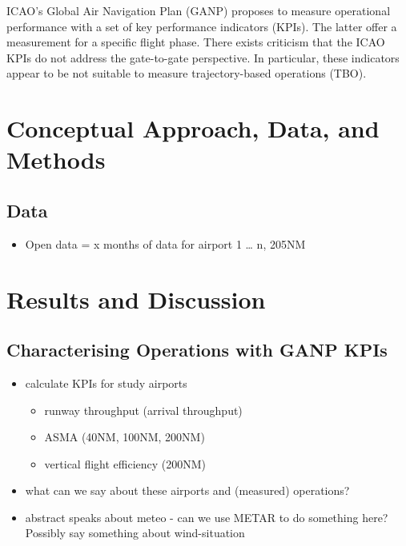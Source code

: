 \documentclass[
  journal,
]{IEEEtran}%
\providecommand{\tightlist}{%
  \setlength{\itemsep}{0pt}\setlength{\parskip}{0pt}}\usepackage{longtable,booktabs,array}
\begin{document}
ICAO's Global Air Navigation Plan (GANP) proposes to measure operational
performance with a set of key performance indicators (KPIs). The latter
offer a measurement for a specific flight phase. There exists criticism
that the ICAO KPIs do not address the gate-to-gate perspective. In
particular, these indicators appear to be not suitable to measure
trajectory-based operations (TBO).

\section{Conceptual Approach, Data, and
Methods}\label{conceptual-approach-data-and-methods}

\subsection{Data}\label{data}

\begin{itemize}
\tightlist
\item
  Open data = x months of data for airport 1 \ldots{} n, 205NM
\end{itemize}

\section{Results and Discussion}\label{results-and-discussion}

\subsection{Characterising Operations with GANP
KPIs}\label{characterising-operations-with-ganp-kpis}

\begin{itemize}
\tightlist
\item
  calculate KPIs for study airports

  \begin{itemize}
  \tightlist
  \item
    runway throughput (arrival throughput)
  \item
    ASMA (40NM, 100NM, 200NM)
  \item
    vertical flight efficiency (200NM)
  \end{itemize}
\item
  what can we say about these airports and (measured) operations?
\item
  abstract speaks about meteo - can we use METAR to do something here?
  Possibly say something about wind-situation
\end{itemize}
\end{document}
